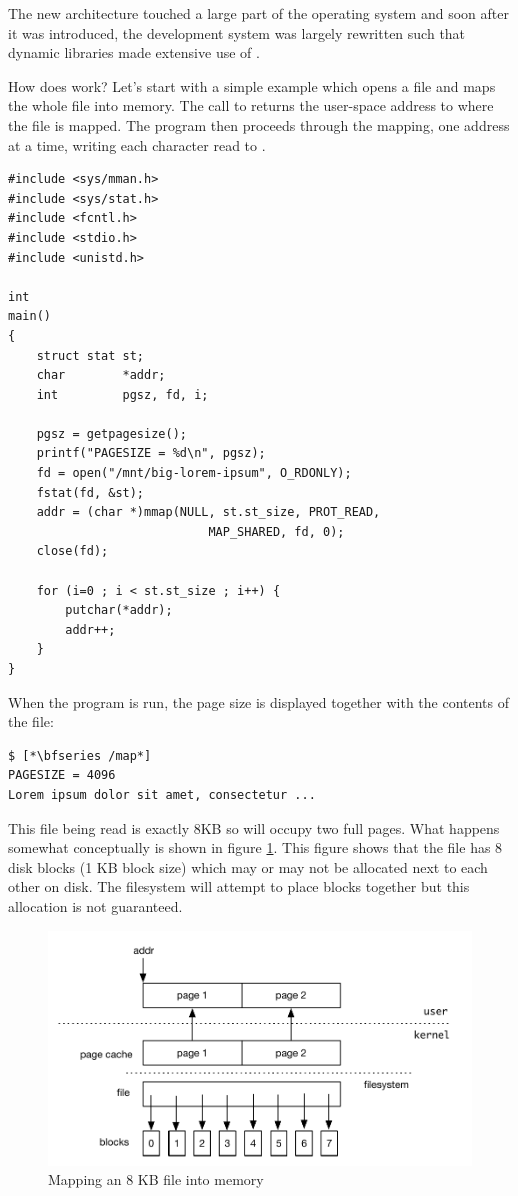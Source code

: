 \noindent
The new architecture touched a large part of the operating system and soon after it was introduced, the development system was largely rewritten such that dynamic libraries made extensive use of .

How does  work? Let's start with a simple example which opens a file and maps the whole file into memory. The call to  returns the user-space address to where the file is mapped. The program then proceeds through the mapping, one address at a time, writing each character read to .

\begin{lstlisting}
#include <sys/mman.h>
#include <sys/stat.h>
#include <fcntl.h>
#include <stdio.h>
#include <unistd.h>

int
main()
{
    struct stat st;
    char        *addr;
    int         pgsz, fd, i;

    pgsz = getpagesize();
    printf("PAGESIZE = %d\n", pgsz);
    fd = open("/mnt/big-lorem-ipsum", O_RDONLY);
    fstat(fd, &st);
    addr = (char *)mmap(NULL, st.st_size, PROT_READ,
                            MAP_SHARED, fd, 0);
    close(fd);

    for (i=0 ; i < st.st_size ; i++) {
        putchar(*addr);
        addr++;
    }
}
\end{lstlisting}

\noindent
When the program is run, the page size is displayed together with the contents of the file:

\begin{lstlisting}
$ [*\bfseries /map*]
PAGESIZE = 4096
Lorem ipsum dolor sit amet, consectetur ...
\end{lstlisting}

\noindent
This file being read is exactly 8KB so will occupy two full pages. What happens somewhat conceptually is shown in figure \ref{fig:mmap-example}. This figure shows that the file has 8 disk blocks (1 KB block size) which may or may not be allocated next to each other on disk. The filesystem will attempt to place blocks together but this allocation is not guaranteed.

\begin{figure}
	\includegraphics[scale=0.6]{figures/mmap-example.pdf}
	\centering
	\caption{Mapping an 8 KB file into memory}
	\label{fig:mmap-example}
\end{figure}

